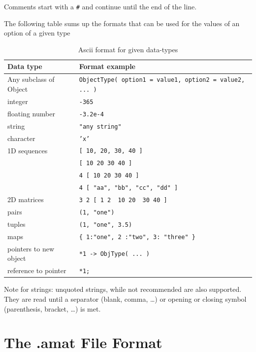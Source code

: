 \documentclass[11pt]{book}
\begin{document}
Comments start with a \verb!#! and continue until the end of the line.

The following table sums up the formats that can be used for the values of
an option of a given type

\begin{table}[h]
\caption{ Ascii format for given data-types }
\label{tab:ascii-format-ex}
\begin{tabular}{|l|l|} \hline 
{\bf Data type}         & {\bf Format example} \\ \hline
Any subclass of Object & {\tt ObjectType( option1 = value1, option2 = value2, ... )} \\ \hline
integer                 & {\tt -365} \\ \hline
floating number         & {\tt -3.2e-4} \\ \hline
string                  & {\tt "any string"} \\ \hline
character               & {\tt 'x'} \\ \hline
1D sequences            & {\tt [ 10, 20, 30, 40 ] } \\ 
                        & {\tt [ 10 20 30 40 ] } \\
                        & {\tt 4 [ 10 20 30 40 ] } \\ 
                        & {\tt 4 [ "aa", "bb", "cc", "dd" ] } \\ \hline
2D matrices             & \verb!3 2 [ 1 2  10 20  30 40 ]!    \\ \hline
pairs                   & {\tt (1, "one")}  \\ \hline
tuples                  & {\tt (1, "one", 3.5)}  \\ \hline
maps                    & \verb!{ 1:"one", 2 :"two", 3: "three" }! \\ \hline
pointers to new object  & \verb!*1 -> ObjType( ... )! \\ \hline
reference to pointer    & \verb!*1;! \\ \hline
\end{tabular}
\begin{center}
\end{center}
\end{table}

Note for strings: unquoted strings, while not recommended are also supported. They are read until
a separator (blank, comma, \ldots) or opening or closing symbol (parenthesis, bracket, \ldots) is met.


\section{The .amat File Format}
\end{document}
